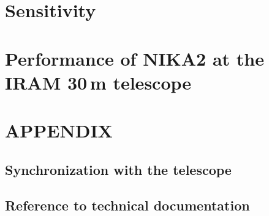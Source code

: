 \documentclass[a4paper, 11pt]{report}
\begin{document}
\chapter{Sensitivity}%
\label{se:nefd}
%

%
%



\clearpage
\chapter{Performance of NIKA2 at the IRAM 30\,m telescope}
\label{se:summary}



\clearpage
\appendix

\chapter{APPENDIX}

  \section{Synchronization with the telescope}
  \label{ap:synchro}
  
  
  \section{Reference to technical documentation}
  \label{ap:doc}
  

  
\end{document}
